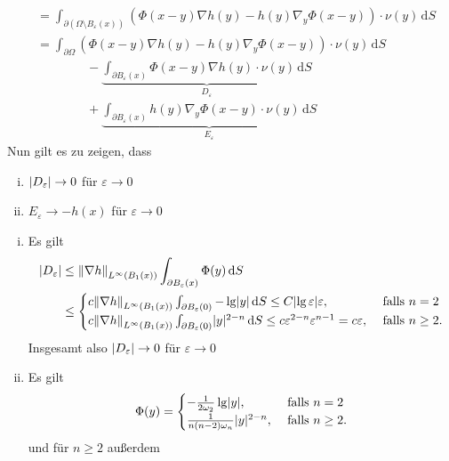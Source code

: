 \begin{beweis}
\begin{align*}
		 &= \int_{\partial ( \Omega \setminus B _{\varepsilon}(x))}^{} \left( \Phi(x-y)  \nabla h(y) - h(y)  \nabla_y \Phi(x-y) \right) \cdot \nu(y) \,\mathrm{d}S \\
		 &= \int_{\partial \Omega}^{} (\Phi(x-y)  \nabla h(y) - h(y)  \nabla_y \Phi(x-y)) \cdot \nu(y) \,\mathrm{d}S \\
		 & \qquad \qquad - \underset{D_{\varepsilon}}{\underbrace{\int_{\partial B_{\varepsilon}(x)}^{} \Phi(x-y)  \nabla h(y) \cdot \nu(y) \,\mathrm{d}S}} \\
		 & \qquad \qquad + \underset{E_{\varepsilon}}{\underbrace{\int_{\partial B_{\varepsilon}(x)}^{} h(y)  \nabla_y \Phi(x-y) \cdot \nu(y) \,\mathrm{d}S}}
	\end{align*}
	Nun gilt es zu zeigen, dass
	\begin{enumerate}[(i)]
		\item $\lvert D_{\varepsilon}\rvert \to 0$ für $\varepsilon \to 0$
		\item $E_\varepsilon \to -h(x)$ für $\varepsilon \to 0$
	\end{enumerate}
	\begin{beweis}
		\begin{enumerate}[(i)]
			\item Es gilt
			\begin{align*}
				\abs{D_{\varepsilon}} &\leq \norm{  \nabla h}_{L^{\infty}(B_1(x))} \int_{ \partial B_{\varepsilon}(x)}^{} \Phi(y) \,\mathrm{d}S \\ &\leq \begin{cases}
					c \norm{ \nabla h}_{L^{\infty}(B_1(x))} \int_{\partial B_{\varepsilon}(0)}^{} 
					- \lg \abs{y} \,\mathrm{d}S \leq C \abs{ \lg \varepsilon}\varepsilon, &\text{ falls }n=2\\
					c \norm{ \nabla h}_{L^{\infty}(B_1(x))} \int_{\partial B_{\varepsilon}(0)}^{} \abs{y}^{2-n} \,\mathrm{d}S 
					\leq  c \varepsilon^{2-n} \varepsilon^{n-1} = c \varepsilon , &\text{ falls } n \geq 2.
				\end{cases}
			\end{align*}
			Insgesamt also $\lvert D_{\varepsilon}\rvert \to 0$ für $\varepsilon \to 0$
			\item Es gilt
			\[
				\Phi(y) = \begin{cases}
					-\frac{1}{2 \omega_2} \lg \lvert y\rvert, &\text{ falls }n=2\\
					\frac{1}{n(n-2)\omega_n} \lvert y\rvert^{2-n} , &\text{ falls } n \geq 2.
				\end{cases}
			\]
			und für $n \geq  2$ außerdem
			\begin{equation}

\end{equation}
\end{enumerate}
\end{beweis}
\end{beweis}
